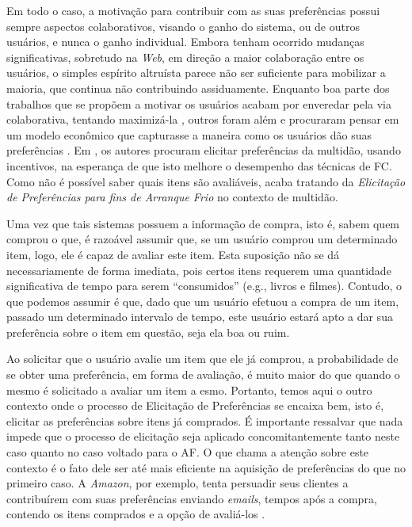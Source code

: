 Em todo o caso, a motivação para contribuir com as suas preferências possui sempre aspectos colaborativos, visando o ganho do sistema, ou de outros usuários, e nunca o ganho individual. Embora tenham ocorrido mudanças significativas, sobretudo na \textit{Web}, em direção a maior colaboração entre os usuários, o simples espírito altruísta parece não ser suficiente para mobilizar a maioria, que continua não contribuindo assiduamente. Enquanto boa parte dos trabalhos que se propõem a motivar os usuários acabam por enveredar pela via colaborativa, tentando maximizá-la \citep{Carenini:2003:TMC:604045.604052, ling_using_JCC4, Rashid:2006:MPD:1124772.1124915}, outros foram além e procuraram pensar em um modelo econômico que capturasse a maneira como os usuários dão suas preferências \citep{harper_economic_2005, market_avery_1999}. Em \citep{lee2013alleviating}, os autores procuram elicitar preferências da multidão, usando incentivos, na esperança de que isto melhore o desempenho das técnicas de FC. Como não é possível saber quais itens são avaliáveis, \citep{lee2013alleviating} acaba tratando da \textit{Elicitação de Preferências para fins de Arranque Frio} no contexto de multidão.


Uma vez que tais sistemas possuem a informação de compra, isto é, sabem quem comprou o que, é razoável assumir que, se um usuário comprou um determinado item, logo, ele é capaz de avaliar este item. Esta suposição não se dá necessariamente de forma imediata, pois certos itens requerem uma quantidade significativa de tempo para serem ``consumidos'' (e.g., livros e filmes). Contudo, o que podemos assumir é que, dado que um usuário efetuou a compra de um item, passado um determinado intervalo de tempo, este usuário estará apto a dar sua preferência sobre o item em questão, seja ela boa ou ruim.

Ao solicitar que o usuário avalie um item que ele já comprou, a probabilidade de se obter uma preferência, em forma de avaliação, é muito maior do que quando o mesmo é solicitado a avaliar um item a esmo. Portanto, temos aqui o outro contexto onde o processo de Elicitação de Preferências se encaixa bem, isto é, elicitar as preferências sobre itens já comprados. É importante ressalvar que nada impede que o processo de elicitação seja aplicado concomitantemente tanto neste caso quanto no caso voltado para o AF. O que chama a atenção sobre este contexto é o fato dele ser até mais eficiente na aquisição de preferências do que no primeiro caso. A \textit{Amazon}, por exemplo, tenta persuadir seus clientes a contribuírem com suas preferências enviando \textit{emails}, tempos após a compra, contendo os itens comprados e a opção de avaliá-los \citep{linden_amazon_2003}.

